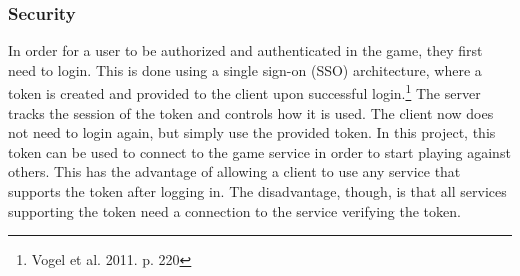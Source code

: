 \subsubsection{Security}
In order for a user to be authorized and authenticated in the game,
they first need to login. This is done using a single sign-on (SSO)
architecture, where a token is created and provided to the client upon
successful login.\footnote{Vogel et al. 2011. p. 220} The server tracks
the session of the token and controls how it is used. The client now does
not need to login again, but simply use the provided token. In this project,
this token can be used to connect to the game service in order to start
 playing against others. This has the advantage of allowing a client to
  use any service that supports the token after logging in. The disadvantage,
   though, is that all services supporting the token need a connection to
   the service verifying the token.
\\
